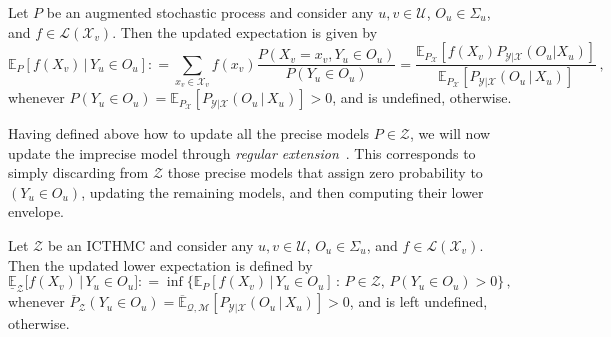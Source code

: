 \documentclass[twoside,11pt]{article}
\newcommand{\states}{\mathcal{X}}
\newcommand{\observs}{\mathcal{Y}}
\newcommand{\uexp}{\overline{\mathbb{E}}_{\rateset,\mathcal{M}}}
\newcommand{\gambles}{\mathcal{L}}
\newcommand{\rateset}{\mathcal{Q}}
\newcommand{\coloneqq}{:\!=}
\begin{document}
\begin{proposition}\label{prop:precise_conditioning_for_positive}
Let $P$ be an augmented stochastic process and consider any $u,v\in\mathcal{U}$, $O_u\in\Sigma_u$, and $f\in\gambles(\states_v)$. Then the updated expectation is given by
\begin{equation*}
\mathbb{E}_P[f(X_v)\,\vert\,Y_u\in O_u] \coloneqq \sum_{x_v\in\states_v}f(x_v)\frac{P(X_v=x_v, Y_u\in O_u)}{P(Y_u\in O_u)} = \frac{\mathbb{E}_{P_\states}[f(X_v)P_{\observs\vert\states}(O_u\vert X_u)]}{\mathbb{E}_{P_\states}[P_{\observs\vert\states}(O_u\,\vert\,X_u)]}\,,
\end{equation*}
whenever $P(Y_u\in O_u)=\mathbb{E}_{P_\states}[P_{\observs\vert\states}(O_u\,\vert\,X_u)]>0$, and is undefined, otherwise.
\end{proposition}

Having defined above how to update all the precise models $P\in\mathcal{Z}$, we will now update the imprecise model through \emph{regular extension}~\citep{Walley:1991vk}. This corresponds to simply discarding from $\mathcal{Z}$ those precise models that assign zero probability to $(Y_u\in O_u)$, updating the remaining models, and then computing their lower envelope.%

\begin{definition}\label{def:reg_ext_pos}
Let $\mathcal{Z}$ be an ICTHMC and consider any $u,v\in\mathcal{U}$, $O_u\in\Sigma_u$, and $f\in\gambles(\states_v)$. Then the updated lower expectation is defined by
\begin{equation*}
\underline{\mathbb{E}}_{\mathcal{Z}}\bigl[f(X_v)\,\vert\,Y_u\in O_u\bigr] \coloneqq \inf\bigl\{ \mathbb{E}_P[f(X_v)\,\vert\,Y_u\in O_u]\,:\, P\in\mathcal{Z},\, P(Y_u\in O_u)>0 \bigr\}\,,
\end{equation*}
whenever $\overline{P}_\mathcal{Z}(Y_u\in O_u)=\uexp[P_{\observs\vert\states}(O_u\,\vert\,X_u)]>0$, and is left undefined, otherwise.
%
\end{definition}
\end{document}
